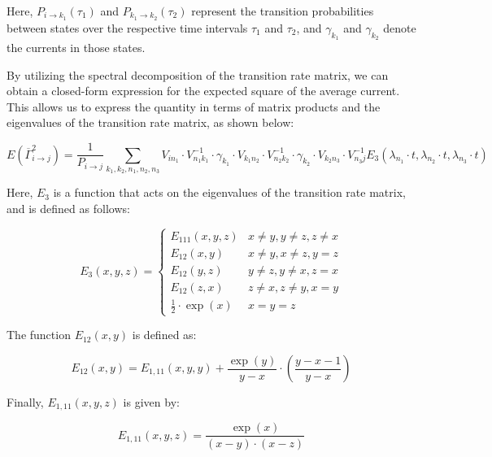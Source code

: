 \documentclass[pdflatex,sn-mathphys-num]{sn-jnl}%
\theoremstyle{thmstyleone}%
\theoremstyle{thmstyletwo}%
\theoremstyle{thmstylethree}%
\begin{document}
Here, \(P_{i \rightarrow k_1}(\tau_1)\) and \(P_{k_1 \rightarrow k_2}(\tau_2)\) represent the transition probabilities between states over the respective time intervals \(\tau_1\) and \(\tau_2\), and \(\gamma_{k_1}\) and \(\gamma_{k_2}\) denote the currents in those states.


By utilizing the spectral decomposition of the transition rate matrix, we can obtain a closed-form expression for the expected square of the average current. This allows us to express the quantity in terms of matrix products and the eigenvalues of the transition rate matrix, as shown below:

\begin{equation}
	E(\overline{\Gamma}_{i \rightarrow j}^2) = \frac{1}{P_{i \rightarrow j}} \sum_{k_1, k_2, n_1, n_2, n_3} V_{i n_1} \cdot V^{-1}_{n_1 k_1} \cdot \gamma_{k_1} \cdot V_{k_1 n_2} \cdot V^{-1}_{n_2 k_2} \cdot \gamma_{k_2} \cdot V_{k_2 n_3} \cdot V^{-1}_{n_3 j} E_3(\lambda_{n_1} \cdot t, \lambda_{n_2} \cdot t, \lambda_{n_3} \cdot t)
    \label{eq:sqr_gamma_formula}
\end{equation}

Here, \(E_3\) is a function that acts on the eigenvalues of the transition rate matrix, and is defined as follows:

\begin{equation}
	E_3(x,y,z)= 
	\begin{cases}
		E_{111}(x,y,z) & x\neq y, y\neq z, z\neq x \\
		E_{12}(x,y) & x\neq y, x\neq z, y = z \\
		E_{12}(y,z) & y\neq z, y\neq x, z = x \\
		E_{12}(z,x) & z\neq x, z\neq y, x = y \\
		\frac{1}{2} \cdot \exp(x) & x=y=z
	\end{cases}
	\label{eq:E_3}
	
\end{equation}

The function \(E_{12}(x, y)\) is defined as:

\begin{equation}
	E_{12}(x,y) = E_{1,11}(x, y, y) + \frac{\exp(y)}{y - x} \cdot \left(\frac{y - x - 1}{y - x}\right)
	\label{eq:E_12}
\end{equation}

Finally, \(E_{1,11}(x, y, z)\) is given by:

\begin{equation}
	E_{1,11}(x, y, z) = \frac{\exp(x)}{(x - y) \cdot (x - z)}
	\label{eq:E_1_11}
\end{equation}
\end{document}

